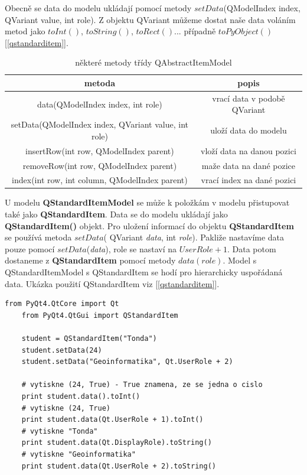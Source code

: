 Obecně se data do modelu ukládají pomocí metody $setData$(QModelIndex
index, QVariant value, int role). Z objektu QVariant můžeme dostat
naše data voláním metod jako $toInt()$, $toString()$,
$toRect()$... případně $toPyObject()$ [\autoref{qstandarditem}].

\begin{table}[h]	
	\centering
{\small
	\begin{tabular}{|c|c|}
		\hline	
		{\bf metoda} & {\bf popis} \\
		\hline
		\hline
		data(QModelIndex index, int role) & vrací data v podobě QVariant \\
		\hline
		setData(QModelIndex index, QVariant value, int role) & uloží data do modelu \\
		\hline
		insertRow(int row, QModelIndex parent) & vloží data na danou pozici \\
		\hline
		removeRow(int row, QModelIndex parent) & maže data na dané pozice \\
		\hline
		index(int row, int column, QModelIndex parent) & vrací index na dané pozici \\
		\hline


	\end{tabular}
}
	\caption{některé metody třídy QAbstractItemModel}
	\label{tab:qabsmodel}
\end{table}

U modelu \textbf{QStandardItemModel} se může k položkám v modelu
přistupovat také jako \textbf{QStandardItem}. Data se do modelu
ukládají jako \textbf{QStandardItem()} objekt. Pro uložení informací
do objektu \textbf{QStandardItem} se používá metoda $setData$(\newline
QVariant \textit{data}, int \textit{role}). Pakliže nastavíme data
pouze pomocí $setData$(\textit{data}), role se nastaví na $UserRole +
1$. Data potom dostaneme z \textbf{QStandardItem} pomocí metody
$data(role)$. Model s QStandardItemModel s QStandardItem se hodí pro
hierarchicky uspořádaná data. Ukázka použití QStandardItem viz
[\autoref{qstandarditem}]. \\

\begin{lstlisting}[label=qstandarditem,caption={QStandardItem - vytvoření a získání dat}, morekeywords={PyQt4, QtCore, QtGui, QStandardItem, Qt, Qt.UserRole, Qt.DisplayRole}]
	from PyQt4.QtCore import Qt
	from PyQt4.QtGui import QStandardItem

	student = QStandardItem("Tonda")
	student.setData(24)
	student.setData("Geoinformatika", Qt.UserRole + 2)

	# vytiskne (24, True) - True znamena, ze se jedna o cislo
	print student.data().toInt() 					
	# vytiskne (24, True)
	print student.data(Qt.UserRole + 1).toInt()		
	# vytiskne "Tonda"
	print student.data(Qt.DisplayRole).toString() 	
	# vytiskne "Geoinformatika"
	print student.data(Qt.UserRole + 2).toString() 	

\end{lstlisting}

